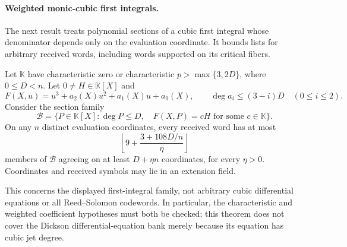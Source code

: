 \paragraph{Weighted monic-cubic first integrals.}
The next result treats polynomial sections of a cubic first integral
whose denominator depends only on the evaluation coordinate.  It bounds
lists for arbitrary received words, including words supported on its
critical fibers.

\begin{theorem}\label{thm:weighted-cubic-first-integral-list}
Let $\mathbb K$ have characteristic zero or characteristic
$p>\max\{3,2D\}$, where $0\le D<n$.  Let $0\ne H\in\mathbb K[X]$ and
\[
 F(X,u)=u^3+a_2(X)u^2+a_1(X)u+a_0(X),
 \qquad \deg a_i\le(3-i)D\quad(0\le i\le2).
\]
Consider the section family
\[
 \mathcal B=\{P\in\mathbb K[X]:\deg P\le D,\quad
                   F(X,P)=cH\text{ for some }c\in\mathbb K\}.
\]
On any $n$ distinct evaluation coordinates, every received word has at most
\[
 \left\lfloor9+\frac{3+108D/n}{\eta}\right\rfloor
\]
members of $\mathcal B$ agreeing on at least $D+\eta n$ coordinates,
for every $\eta>0$.  Coordinates and received symbols may lie in an
extension field.
\end{theorem}

This concerns the displayed first-integral family, not arbitrary cubic
differential equations or all Reed--Solomon codewords.  In particular,
the characteristic and weighted coefficient hypotheses must both be
checked; this theorem does not cover the Dickson differential-equation
bank merely because its equation has cubic jet degree.

